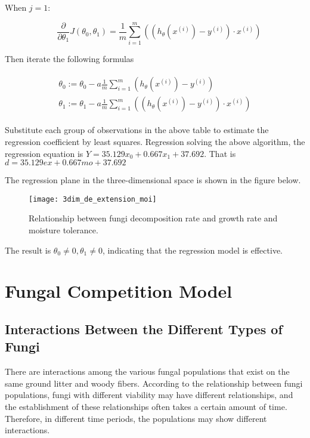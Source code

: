 \documentclass{mcmthesis}
\begin{document}
When $ j=1 $:

\begin{equation}
  \quad \frac{\partial}{\partial \theta_{1}} J\left(\theta_{0}, \theta_{1}\right)=\frac{1}{m} \sum_{i=1}^{m}\left(\left(h_{\theta}\left(x^{(i)}\right)-y^{(i)}\right) \cdot x^{(i)}\right)
\end{equation}

Then iterate the following formulas

\begin{equation}
  \begin{split}
    \begin{array}{l}
      \theta_{0}:=\theta_{0}-a \frac{1}{m} \sum_{i=1}^{m}\left(h_{\theta}\left(x^{(i)}\right)-y^{(i)}\right) \\
      \theta_{1}:=\theta_{1}-a \frac{1}{m} \sum_{i=1}^{m}\left(\left(h_{\theta}\left(x^{(i)}\right)-y^{(i)}\right) \cdot x^{(i)}\right)
    \end{array}
  \end{split}
\end{equation}

Substitute each group of observations in the above table to estimate the regression coefficient by least squares. Regression solving the above algorithm, the regression equation is $ Y = 35.129x_0 +0.667x_1 + 37.692 $. That is $ d = 35.129ex +0.667mo + 37.692 $ 

The regression plane in the three-dimensional space is shown in the figure below.

\begin{figure}[H]
  \small
  \centering
  \texttt{[image: 3dim\_de\_extension\_moi]}
  \caption{Relationship between fungi decomposition rate and growth rate and moisture tolerance.}
  \label{3dim_de_extension_moi}
\end{figure}

The result is $ \theta_0\ne0,\theta_1\ne 0 $, indicating that the regression model is effective.

\section{Fungal Competition Model}

\subsection{Interactions Between the Different Types of Fungi}

There are interactions among the various fungal populations that exist on the same ground litter and woody fibers. According to the relationship between fungi populations, fungi with different viability may have different relationships, and the establishment of these relationships often takes a certain amount of time. Therefore, in different time periods, the populations may show different interactions.
\end{document}
